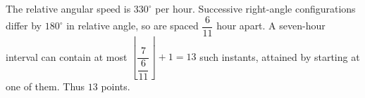 The relative angular speed is $330^\circ$ per hour. Successive right-angle configurations differ by $180^\circ$ in relative angle, so are spaced $\dfrac{6}{11}$ hour apart. A seven-hour interval can contain at most $\left\lfloor\dfrac{7}{\dfrac{6}{11}}\right\rfloor+1=13$ such instants, attained by starting at one of them. Thus $\boxed{13}$ points.
